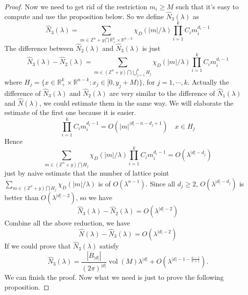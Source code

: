 \documentclass[10pt,a4paper]{amsart}
\newcommand{\R}{{\mathbb R}}
\newcommand{\Z}{{\mathbb Z}}
\newcommand{\vol}{\operatorname{vol}}
\begin{document}
\begin{proof}
    Now we need to get rid of the restriction $m_i \geq M$ such that it's easy to compute and use the proposition below. So we define $\hat{N}_3(\lambda)$ as
    \[
    \hat{N}_3(\lambda) = \sum_{m \in  \Z^{n} + y \bigcap \R_{+}^k \times \R^{n-k}} \chi_D(|m|/\lambda) \prod_{i=1}^k C_im_i^{d_i-1}
    \]
    The difference between $\hat{N}_2(\lambda)$ and $\hat{N}_3(\lambda)$ is just
    \[
    \hat{N}_3(\lambda) - \hat{N}_2(\lambda) = \sum_{m \in  (\Z^{n} + y) \bigcap \bigcup_{j=1}^k H_j} \chi_D(|m|/\lambda) \prod_{i=1}^k C_im_i^{d_i-1}
    \]
    where $H_j = \{ x \in \R_{+}^k \times \R^{n-k} : x_j \in [0,y_j+M)\}$, for $j = 1, \cdots, k$. Actually the difference of $\hat{N}_3(\lambda) $ and $\hat{N}_2(\lambda) $ are very similar to the difference of $\hat{N}_1(\lambda) $ and $\hat{N}(\lambda) $, we could estimate them in the same way. We will elaborate the estimate of the first one because it is easier.
    \[
    \prod_{i=1}^k C_i m_i^{d_i-1} = O(|m|^{|d|-n-d_j+1}) \quad x \in H_j
    \]
    Hence 
    \[
    \sum_{m \in  (\Z^{n} + y) \bigcap H_j} \chi_D(|m|/\lambda) \prod_{i=1}^k C_im_i^{d_i-1} = O(\lambda^{|d|-d_j})
    \]
    just by naive estimate that the number of lattice point $\sum_{m \in  (\Z^{n} + y) \bigcap H_j} \chi_D(|m|/\lambda)$ is of $O(\lambda^{n-1})$. Since all $d_j \geq 2$, $O(\lambda^{|d|-d_j})$ is better than $O(\lambda^{|d|-2})$, so we have 
    \begin{equation}
        \hat{N}_3(\lambda) - \hat{N}_2(\lambda) = O(\lambda^{|d|-2})
    \end{equation}
    Combine all the above reduction, we have 
    \begin{equation}
        \hat{N}(\lambda) - \hat{N}_3(\lambda) = O(\lambda^{|d|-2})
    \end{equation}
    If we could prove that $\hat{N}_3(\lambda)$ satisfy
    \begin{equation}
        \hat{N}_3(\lambda) = \frac{|B_{|d|}|}{(2\pi)^{|d|}} \vol(M) \lambda^{|d|} + O(\lambda^{|d|-1-\frac{n-1}{n+1}}).
    \end{equation}
    We can finish the proof. Now what we need is just to prove the following proposition.
\end{proof}
\end{document}
